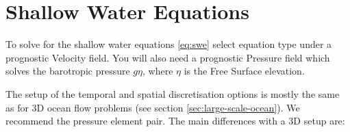 
\section{Shallow Water Equations} \label{sec:shallow_water_equations}
To solve for the shallow water equations \eqref{eq:swe} select equation type
 under a prognostic Velocity field. You will
also need a prognostic Pressure field which solves the barotropic pressure
$g\eta$, where $\eta$ is the Free Surface elevation.

The setup of the temporal
and spatial discretisation options is mostly the same as for 3D ocean
flow problems (see section \ref{sec:large-scale-ocean}). We recommend the \PoDGPt pressure element pair. The
main differences with a 3D setup are:

